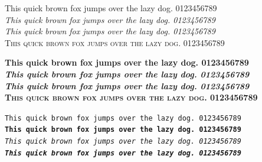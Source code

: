 \documentclass{article}
\begin{document}
This quick brown fox jumps over the lazy dog. 0123456789 \\
\textit{This quick brown fox jumps over the lazy dog. 0123456789} \\
\textsl{This quick brown fox jumps over the lazy dog. 0123456789} \\
\textsc{This quick brown fox jumps over the lazy dog. 0123456789} \par

\textbf{This quick brown fox jumps over the lazy dog. 0123456789} \\
\textbf{\textit{This quick brown fox jumps over the lazy dog. 0123456789}} \\
\textbf{\textsl{This quick brown fox jumps over the lazy dog. 0123456789}} \\
\textbf{\textsc{This quick brown fox jumps over the lazy dog. 0123456789}} \par

\texttt{This quick brown fox jumps over the lazy dog. 0123456789} \\
\textbf{\texttt{This quick brown fox jumps over the lazy dog. 0123456789}} \\
\emph{\texttt{This quick brown fox jumps over the lazy dog. 0123456789}} \\
\textbf{\emph{\texttt{This quick brown fox jumps over the lazy dog. 0123456789}}}
\end{document}
